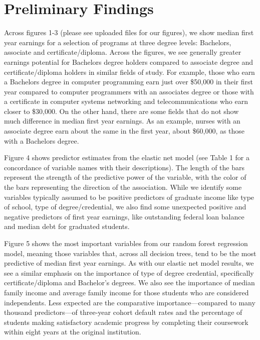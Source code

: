 \documentclass[a4paper, 12pt]{article}
\begin{document}
\section*{Preliminary Findings}

Across figures 1-3 (please see uploaded files for our figures), we show median first year earnings for a selection of programs at three degree levels: Bachelors, associate and certificate/diploma. Across the figures, we see generally greater earnings potential for Bachelors degree holders compared to associate degree and certificate/diploma holders in similar fields of study. For example, those who earn a Bachelors degree in computer programming earn just over \$50,000 in their first year compared to computer programmers with an associates degree or those with a certificate in computer systems networking and telecommunications who earn closer to \$30,000. On the other hand, there are some fields that do not show much difference in median first year earnings. As an example, nurses with an associate degree earn about the same in the first year, about \$60,000, as those with a Bachelors degree.

Figure 4 shows predictor estimates from the elastic net model (see Table 1 for a concordance of variable names with their descriptions). The length of the bars represent the strength of the predictive power of the variable, with the color of the bars representing the direction of the association. While we identify some variables typically assumed to be positive predictors of graduate income like type of school, type of degree/credential, we also find some unexpected positive and negative predictors of first year earnings, like outstanding federal loan balance and median debt for graduated students.

Figure 5 shows the most important variables from our random forest regression model, meaning those variables that, across all decision trees, tend to be the most predictive of median first year earnings. As with our elastic net model results, we see a similar emphasis on the importance of type of degree credential, specifically certificate/diploma and Bachelor's degrees. We also see the importance of median family income and average family income for those students who are considered independents. Less expected are the comparative importance---compared to many thousand predictors---of three-year cohort default rates and the percentage of students making satisfactory academic progress by completing their coursework within eight years at the original institution.
\end{document}
